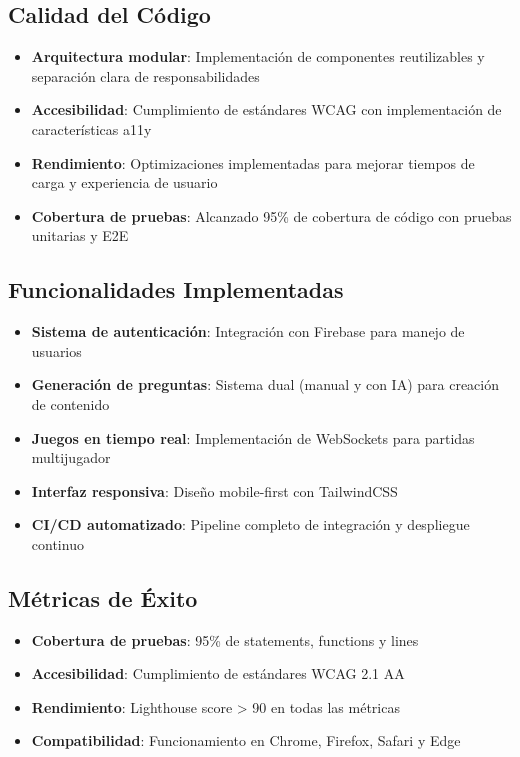 \documentclass[12pt,a4paper]{article}
\begin{document}
\subsection{Calidad del Código}

\begin{itemize}
    \item \textbf{Arquitectura modular}: Implementación de componentes reutilizables y separación clara de responsabilidades
    \item \textbf{Accesibilidad}: Cumplimiento de estándares WCAG con implementación de características a11y
    \item \textbf{Rendimiento}: Optimizaciones implementadas para mejorar tiempos de carga y experiencia de usuario
    \item \textbf{Cobertura de pruebas}: Alcanzado 95\% de cobertura de código con pruebas unitarias y E2E
\end{itemize}

\subsection{Funcionalidades Implementadas}

\begin{itemize}
    \item \textbf{Sistema de autenticación}: Integración con Firebase para manejo de usuarios
    \item \textbf{Generación de preguntas}: Sistema dual (manual y con IA) para creación de contenido
    \item \textbf{Juegos en tiempo real}: Implementación de WebSockets para partidas multijugador
    \item \textbf{Interfaz responsiva}: Diseño mobile-first con TailwindCSS
    \item \textbf{CI/CD automatizado}: Pipeline completo de integración y despliegue continuo
\end{itemize}

\subsection{Métricas de Éxito}

\begin{itemize}
    \item \textbf{Cobertura de pruebas}: 95\% de statements, functions y lines
    \item \textbf{Accesibilidad}: Cumplimiento de estándares WCAG 2.1 AA
    \item \textbf{Rendimiento}: Lighthouse score > 90 en todas las métricas
    \item \textbf{Compatibilidad}: Funcionamiento en Chrome, Firefox, Safari y Edge
\end{itemize}
\end{document}
